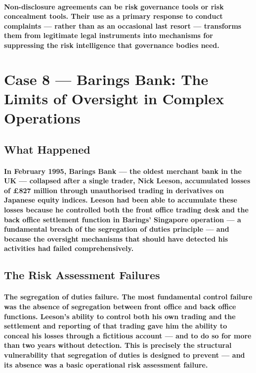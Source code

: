 \paragraph{\textbf{Non-disclosure agreements can be risk governance tools or risk concealment tools. Their use as a primary response to conduct complaints — rather than as an occasional last resort — transforms them from legitimate legal instruments into mechanisms for suppressing the risk intelligence that governance bodies need.}}

\section{Case 8 — Barings Bank: The Limits of Oversight in Complex Operations}

\subsection{What Happened}
\paragraph{In February 1995, Barings Bank — the oldest merchant bank in the UK — collapsed after a single trader, Nick Leeson, accumulated losses of £827 million through unauthorised trading in derivatives on Japanese equity indices. Leeson had been able to accumulate these losses because he controlled both the front office trading desk and the back office settlement function in Barings' Singapore operation — a fundamental breach of the segregation of duties principle — and because the oversight mechanisms that should have detected his activities had failed comprehensively.}

\subsection{The Risk Assessment Failures}
\paragraph{\textbf{The segregation of duties failure}. The most fundamental control failure was the absence of segregation between front office and back office functions. Leeson's ability to control both his own trading and the settlement and reporting of that trading gave him the ability to conceal his losses through a fictitious account — and to do so for more than two years without detection. This is precisely the structural vulnerability that segregation of duties is designed to prevent — and its absence was a basic operational risk assessment failure.}
